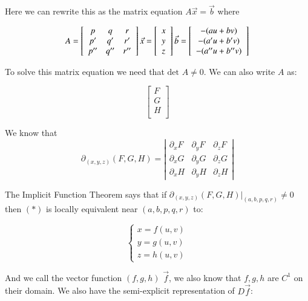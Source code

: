 \documentclass [12 pt, twoside] {book}
\newcommand\+{\text{ }}
\newcommand{\det}{\text{det }}
\begin{document}
Here we can rewrite this as the matrix equation $A\vec{x} = \vec{b}$ where

\[
    A = 
    \left[\begin{array}{ccc}
            p & q & r\\
            p' & q' & r'\\
            p'' & q'' & r''
    \end{array}\right]
    \hfill
    \vec{x} =
    \left[\begin{array}{c}
            x\\
            y\\
            z\\
    \end{array}\right]
    \hfill
    \vec{b} = 
    \left[\begin{array}{c}
            -(au + bv) \\
            -(a'u + b'v) \\
            -(a''u + b''v) \\
    \end{array}\right]
\]

To solve this matrix equation we need that $\det A \neq 0$. We can also write
$A$ as:

\[
    \left[\begin{array}{c}
        F \\
        G \\
        H \\
    \end{array}\right]
\]

We know that
$$\partial_{(x, y, z)} (F, G, H) = \left|
    \begin{array}{ccc}
        \partial_x F & \partial_y F & \partial_z F \\
        \partial_x G & \partial_y G & \partial_z G \\
        \partial_x H & \partial_y H & \partial_z H
    \end{array}
\right|$$

The Implicit Function Theorem says that if $\partial_{(x, y, z)} (F, G, H)
|_{(a, b, p, q, r)} \neq 0$ then $(*)$ is locally equivalent near $(a, b, p, q,
r)$ to:

\[
    \begin{cases}
        x = f(u, v) \\
        y = g(u, v) \\
        z = h(u, v)
    \end{cases}
\]

And we call the vector function $(f, g, h)$ $\vec{f}$, we also know that $f, g,
h$ are $C^1$ on their domain. We also have the semi-explicit representation of
$D\vec{f}$:
\end{document}
